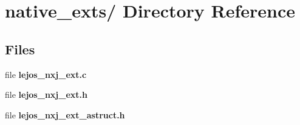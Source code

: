 \section{native\_\-exts/ Directory Reference}
\label{dir_bfdb491fc48c646619dc727e5e7ba395}
\subsection*{Files}
\begin{DoxyCompactItemize}
\item 
file {\bfseries lejos\_\-nxj\_\-ext.c}
\item 
file {\bfseries lejos\_\-nxj\_\-ext.h}
\item 
file {\bfseries lejos\_\-nxj\_\-ext\_\-astruct.h}
\end{DoxyCompactItemize}
